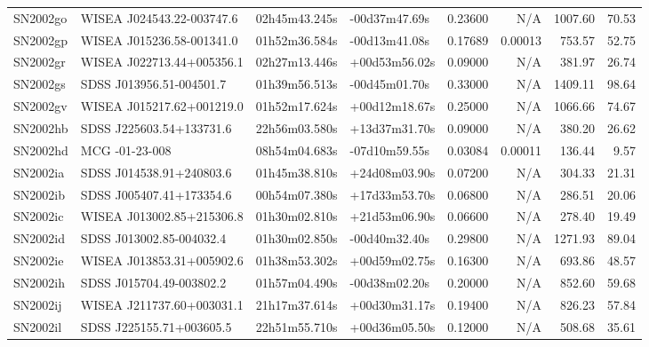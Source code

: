 \begin{longtable}{llllrrrr}
SN2002go         &       WISEA J024543.22-003747.6 &   02h45m43.245s &   -00d37m47.69s &  0.23600 &      N/A &  1007.60 &       70.53 \\
SN2002gp         &       WISEA J015236.58-001341.0 &   01h52m36.584s &   -00d13m41.08s &  0.17689 &  0.00013 &   753.57 &       52.75 \\
SN2002gr         &       WISEA J022713.44+005356.1 &   02h27m13.446s &   +00d53m56.02s &  0.09000 &      N/A &   381.97 &       26.74 \\
SN2002gs         &        SDSS J013956.51-004501.7 &   01h39m56.513s &   -00d45m01.70s &  0.33000 &      N/A &  1409.11 &       98.64 \\
SN2002gv         &       WISEA J015217.62+001219.0 &   01h52m17.624s &   +00d12m18.67s &  0.25000 &      N/A &  1066.66 &       74.67 \\
SN2002hb         &        SDSS J225603.54+133731.6 &   22h56m03.580s &   +13d37m31.70s &  0.09000 &      N/A &   380.20 &       26.62 \\
SN2002hd         &                  MCG -01-23-008 &   08h54m04.683s &   -07d10m59.55s &  0.03084 &  0.00011 &   136.44 &        9.57 \\
SN2002ia         &        SDSS J014538.91+240803.6 &   01h45m38.810s &   +24d08m03.90s &  0.07200 &      N/A &   304.33 &       21.31 \\
SN2002ib         &        SDSS J005407.41+173354.6 &   00h54m07.380s &   +17d33m53.70s &  0.06800 &      N/A &   286.51 &       20.06 \\
SN2002ic         &       WISEA J013002.85+215306.8 &   01h30m02.810s &   +21d53m06.90s &  0.06600 &      N/A &   278.40 &       19.49 \\
SN2002id         &        SDSS J013002.85-004032.4 &   01h30m02.850s &   -00d40m32.40s &  0.29800 &      N/A &  1271.93 &       89.04 \\
SN2002ie         &       WISEA J013853.31+005902.6 &   01h38m53.302s &   +00d59m02.75s &  0.16300 &      N/A &   693.86 &       48.57 \\
SN2002ih         &        SDSS J015704.49-003802.2 &   01h57m04.490s &   -00d38m02.20s &  0.20000 &      N/A &   852.60 &       59.68 \\
SN2002ij         &       WISEA J211737.60+003031.1 &   21h17m37.614s &   +00d30m31.17s &  0.19400 &      N/A &   826.23 &       57.84 \\
SN2002il         &        SDSS J225155.71+003605.5 &   22h51m55.710s &   +00d36m05.50s &  0.12000 &      N/A &   508.68 &       35.61 \\

\end{longtable}
